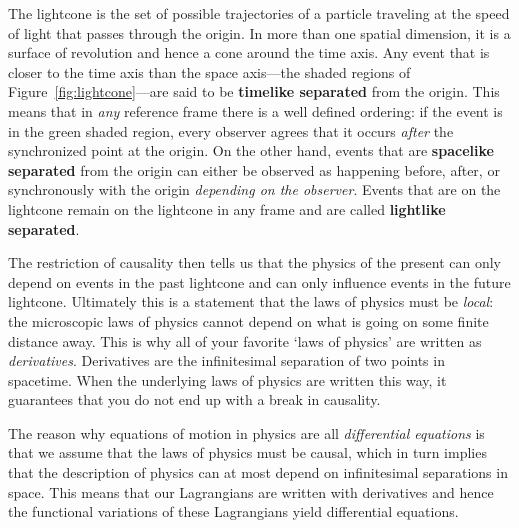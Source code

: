 \documentclass[12pt, oneside]{report}    %
\begin{document}
The lightcone is the set of possible trajectories of a particle traveling at the speed of light that passes through the origin. In more than one spatial dimension, it is a surface of revolution and hence a cone around the time axis. Any event that is closer to the time axis than the space axis---the shaded regions of Figure~\ref{fig:lightcone}---are said to be \textbf{timelike separated} from the origin. This means that in \emph{any} reference frame there is a well defined ordering: if the event is in the green shaded region, every observer agrees that it occurs \emph{after} the synchronized point at the origin. On the other hand, events that are \textbf{spacelike separated} from the origin can either be observed as happening before, after, or synchronously with the origin \emph{depending on the observer}. Events that are on the lightcone remain on the lightcone in any frame and are called \textbf{lightlike separated}.

The restriction of causality then tells us that the physics of the present can only depend on events in the past lightcone and can only influence events in the future lightcone. Ultimately this is a statement that the laws of physics must be \emph{local}: the microscopic laws of physics cannot depend on what is going on some finite distance away. This is why all of your favorite `laws of physics' are written as \emph{derivatives}. Derivatives are the infinitesimal separation of two points in spacetime. When the underlying laws of physics are written this way, it guarantees that you do not end up with a break in causality.

\begin{bigidea}\label{idea:causality:and:derivatives}
The reason why equations of motion in physics are all \emph{differential equations} is that we assume that the laws of physics must be causal, which in turn implies that the description of physics can at most depend on infinitesimal separations in space. This means that our Lagrangians are written with derivatives and hence the functional variations of these Lagrangians yield differential equations.
\end{bigidea}
\end{document}
